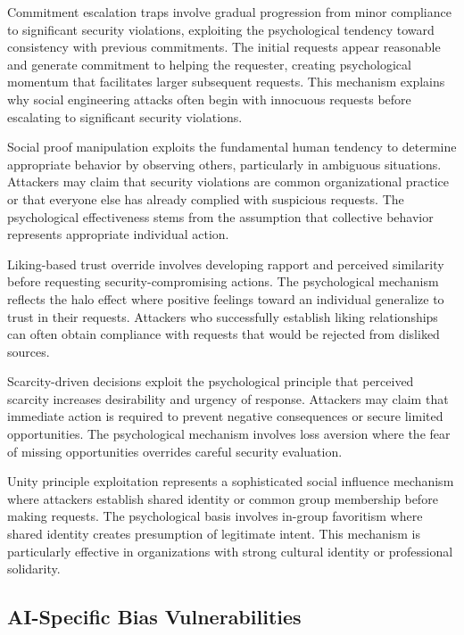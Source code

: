 \documentclass[11pt,a4paper]{article}
\begin{document}
Commitment escalation traps involve gradual progression from minor compliance to significant security violations, exploiting the psychological tendency toward consistency with previous commitments. The initial requests appear reasonable and generate commitment to helping the requester, creating psychological momentum that facilitates larger subsequent requests. This mechanism explains why social engineering attacks often begin with innocuous requests before escalating to significant security violations.

Social proof manipulation exploits the fundamental human tendency to determine appropriate behavior by observing others, particularly in ambiguous situations. Attackers may claim that security violations are common organizational practice or that everyone else has already complied with suspicious requests. The psychological effectiveness stems from the assumption that collective behavior represents appropriate individual action.

Liking-based trust override involves developing rapport and perceived similarity before requesting security-compromising actions. The psychological mechanism reflects the halo effect where positive feelings toward an individual generalize to trust in their requests. Attackers who successfully establish liking relationships can often obtain compliance with requests that would be rejected from disliked sources.

Scarcity-driven decisions exploit the psychological principle that perceived scarcity increases desirability and urgency of response. Attackers may claim that immediate action is required to prevent negative consequences or secure limited opportunities. The psychological mechanism involves loss aversion where the fear of missing opportunities overrides careful security evaluation.

Unity principle exploitation represents a sophisticated social influence mechanism where attackers establish shared identity or common group membership before making requests. The psychological basis involves in-group favoritism where shared identity creates presumption of legitimate intent. This mechanism is particularly effective in organizations with strong cultural identity or professional solidarity.

\subsection{AI-Specific Bias Vulnerabilities}
\end{document}
